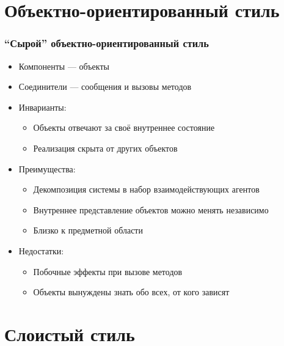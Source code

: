 \documentclass{../cscslides}
\begin{document}
    \section{Объектно-ориентированный стиль}

    \begin{frame}
        \frametitle{``Сырой'' объектно-ориентированный стиль}
        \begin{itemize}
            \item Компоненты --- объекты
            \item Соединители --- сообщения и вызовы методов
            \item Инварианты:
            \begin{itemize}
                \item Объекты отвечают за своё внутреннее состояние
                \item Реализация скрыта от других объектов
            \end{itemize}
            \item Преимущества:
            \begin{itemize}
                \item Декомпозиция системы в набор взаимодействующих агентов
                \item Внутреннее представление объектов можно менять независимо
                \item Близко к предметной области
            \end{itemize}
            \item Недостатки:
            \begin{itemize}
                \item Побочные эффекты при вызове методов
                \item Объекты вынуждены знать обо всех, от кого зависят
            \end{itemize}
        \end{itemize}
    \end{frame}

    \section{Слоистый стиль}
\end{document}
